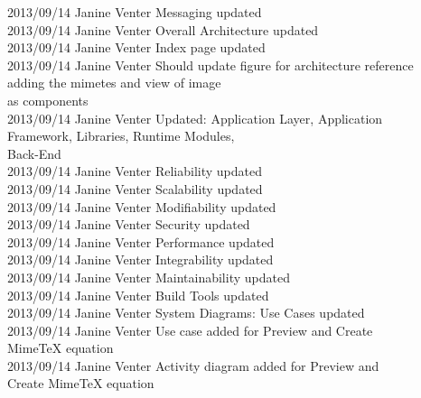 \documentclass[29pt,a4paper]{moderncv}
\begin{document}
\begin{tabbing}
2013/09/14  \> Janine Venter \> Messaging updated\\
2013/09/14  \> Janine Venter \> Overall Architecture updated\\
2013/09/14  \> Janine Venter \> Index page updated\\
2013/09/14  \> Janine Venter \> Should update figure for architecture reference \\ \> \> \> adding the mimetes and view of image \\ \> \> \> as components\\
2013/09/14  \> Janine Venter \> Updated: Application Layer, Application \\ \> \> \> Framework, Libraries, Runtime Modules, \\ \> \> \> Back-End\\
2013/09/14  \> Janine Venter \> Reliability updated\\
2013/09/14  \> Janine Venter \> Scalability updated\\
2013/09/14  \> Janine Venter \>Modifiability updated\\
2013/09/14  \> Janine Venter \> Security updated\\
2013/09/14  \> Janine Venter \> Performance updated\\
2013/09/14  \> Janine Venter \> Integrability updated\\
2013/09/14  \> Janine Venter \> Maintainability updated\\
2013/09/14  \> Janine Venter \> Build Tools updated\\
2013/09/14  \> Janine Venter \>System Diagrams: Use Cases updated\\
2013/09/14  \> Janine Venter \> Use case added for  Preview and Create \\ \> \> \> MimeTeX equation\\
2013/09/14  \> Janine Venter \> Activity diagram added for Preview and \\ \> \> \> Create MimeTeX equation\\



\end{tabbing}


\newpage
\end{document}
